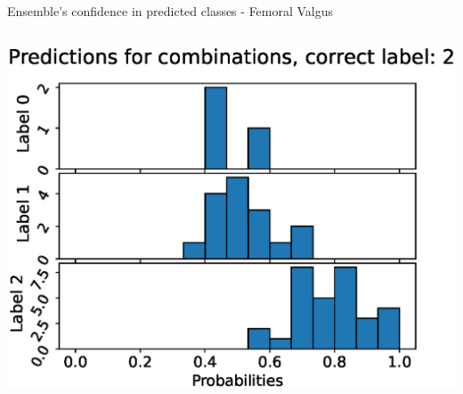 \begin{frame}[fragile]{Ensemble's confidence in predicted classes - Femoral Valgus}
\begin{columns}[T,onlytextwidth]
      \includegraphics[width=\textwidth]{files/figs/res/femval/pc2.eps}
  \end{columns}
\end{frame}

